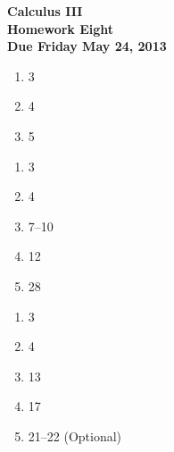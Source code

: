 \documentclass[12pt]{article}
\begin{document}
\pagestyle{empty}
 
\begin{center}
{\large {\bf Calculus III}}\\
\medskip
{\large {\bf Homework Eight}}\\
\medskip
{ {\bf Due Friday May 24, 2013}}\\
\end{center}

\bigskip



\begin{enumerate}
\setlength{\itemsep}{-1mm}
  \item 3
  \item 4
  \item 5
\end{enumerate}


\begin{enumerate}
\setlength{\itemsep}{-1mm}
  \item 3
  \item 4
  \item 7--10
  \item 12
  \item 28
\end{enumerate}

\begin{enumerate}
\setlength{\itemsep}{-1mm}
  \item 3
  \item 4
  \item 13
  \item 17
  \item 21--22 (Optional)
\end{enumerate}
\end{document}
